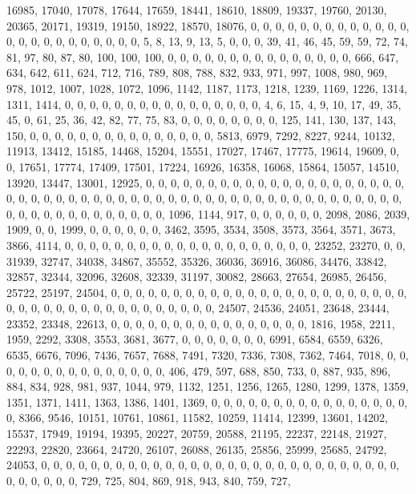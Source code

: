 \documentclass[
]{article}
\begin{document}
16985, 17040, 17078, 17644, 17659, 18441, 18610, 18809, 19337, 19760,
20130, 20365, 20171, 19319, 19150, 18922, 18570, 18076, 0, 0, 0, 0, 0,
0, 0, 0, 0, 0, 0, 0, 0, 0, 0, 0, 0, 0, 0, 0, 0, 0, 0, 0, 5, 8, 13, 9,
13, 5, 0, 0, 0, 39, 41, 46, 45, 59, 59, 72, 74, 81, 97, 80, 87, 80, 100,
100, 100, 0, 0, 0, 0, 0, 0, 0, 0, 0, 0, 0, 0, 0, 0, 0, 666, 647, 634,
642, 611, 624, 712, 716, 789, 808, 788, 832, 933, 971, 997, 1008, 980,
969, 978, 1012, 1007, 1028, 1072, 1096, 1142, 1187, 1173, 1218, 1239,
1169, 1226, 1314, 1311, 1414, 0, 0, 0, 0, 0, 0, 0, 0, 0, 0, 0, 0, 0, 0,
0, 0, 4, 6, 15, 4, 9, 10, 17, 49, 35, 45, 0, 61, 25, 36, 42, 82, 77, 75,
83, 0, 0, 0, 0, 0, 0, 0, 0, 125, 141, 130, 137, 143, 150, 0, 0, 0, 0, 0,
0, 0, 0, 0, 0, 0, 0, 0, 0, 0, 5813, 6979, 7292, 8227, 9244, 10132,
11913, 13412, 15185, 14468, 15204, 15551, 17027, 17467, 17775, 19614,
19609, 0, 0, 17651, 17774, 17409, 17501, 17224, 16926, 16358, 16068,
15864, 15057, 14510, 13920, 13447, 13001, 12925, 0, 0, 0, 0, 0, 0, 0, 0,
0, 0, 0, 0, 0, 0, 0, 0, 0, 0, 0, 0, 0, 0, 0, 0, 0, 0, 0, 0, 0, 0, 0, 0,
0, 0, 0, 0, 0, 0, 0, 0, 0, 0, 0, 0, 0, 0, 0, 0, 0, 0, 0, 0, 0, 0, 0, 0,
0, 0, 0, 0, 0, 0, 0, 0, 0, 0, 1096, 1144, 917, 0, 0, 0, 0, 0, 0, 2098,
2086, 2039, 1909, 0, 0, 1999, 0, 0, 0, 0, 0, 0, 3462, 3595, 3534, 3508,
3573, 3564, 3571, 3673, 3866, 4114, 0, 0, 0, 0, 0, 0, 0, 0, 0, 0, 0, 0,
0, 0, 0, 0, 0, 0, 0, 0, 23252, 23270, 0, 0, 31939, 32747, 34038, 34867,
35552, 35326, 36036, 36916, 36086, 34476, 33842, 32857, 32344, 32096,
32608, 32339, 31197, 30082, 28663, 27654, 26985, 26456, 25722, 25197,
24504, 0, 0, 0, 0, 0, 0, 0, 0, 0, 0, 0, 0, 0, 0, 0, 0, 0, 0, 0, 0, 0, 0,
0, 0, 0, 0, 0, 0, 0, 0, 0, 0, 0, 0, 0, 0, 0, 0, 0, 0, 0, 24507, 24536,
24051, 23648, 23444, 23352, 23348, 22613, 0, 0, 0, 0, 0, 0, 0, 0, 0, 0,
0, 0, 0, 0, 0, 0, 1816, 1958, 2211, 1959, 2292, 3308, 3553, 3681, 3677,
0, 0, 0, 0, 0, 0, 0, 6991, 6584, 6559, 6326, 6535, 6676, 7096, 7436,
7657, 7688, 7491, 7320, 7336, 7308, 7362, 7464, 7018, 0, 0, 0, 0, 0, 0,
0, 0, 0, 0, 0, 0, 0, 0, 0, 406, 479, 597, 688, 850, 733, 0, 887, 935,
896, 884, 834, 928, 981, 937, 1044, 979, 1132, 1251, 1256, 1265, 1280,
1299, 1378, 1359, 1351, 1371, 1411, 1363, 1386, 1401, 1369, 0, 0, 0, 0,
0, 0, 0, 0, 0, 0, 0, 0, 0, 0, 0, 0, 0, 8366, 9546, 10151, 10761, 10861,
11582, 10259, 11414, 12399, 13601, 14202, 15537, 17949, 19194, 19395,
20227, 20759, 20588, 21195, 22237, 22148, 21927, 22293, 22820, 23664,
24720, 26107, 26088, 26135, 25856, 25999, 25685, 24792, 24053, 0, 0, 0,
0, 0, 0, 0, 0, 0, 0, 0, 0, 0, 0, 0, 0, 0, 0, 0, 0, 0, 0, 0, 0, 0, 0, 0,
0, 0, 0, 0, 0, 0, 0, 0, 729, 725, 804, 869, 918, 943, 840, 759, 727,
\end{document}
